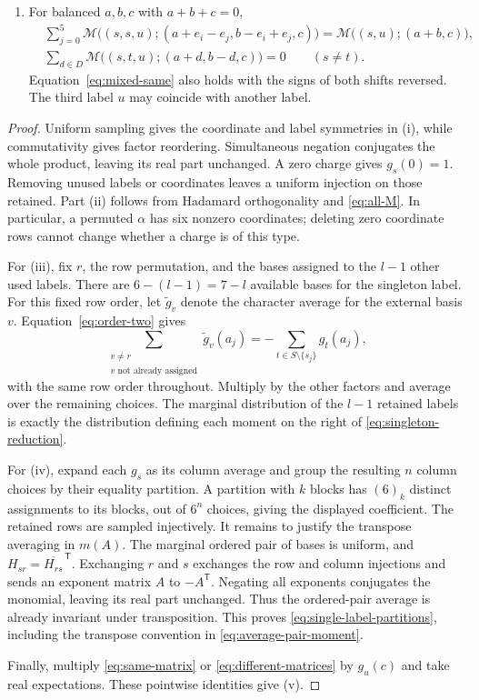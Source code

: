 \begin{lemma}
\begin{enumerate}[label=\textup{(\roman*)}]
 \item For balanced $a,b,c$ with $a+b+c=0$,
 \begin{align}
 &\sum_{j=0}^5
 \mathcal M\bigl((s,s,u);
       (a+e_i-e_j,b-e_i+e_j,c)\bigr)
   =\mathcal M\bigl((s,u);(a+b,c)\bigr),
       \label{eq:mixed-same}\\
 &\sum_{d\in D}
 \mathcal M\bigl((s,t,u);(a+d,b-d,c)\bigr)=0
       \qquad(s\ne t).
       \label{eq:mixed-different}
 \end{align}
 Equation~\eqref{eq:mixed-same} also holds with the signs of both shifts
 reversed. The third label $u$ may coincide with another label.
\end{enumerate}
\end{lemma}

\begin{proof}
Uniform sampling gives the coordinate and label symmetries in (i), while
commutativity gives factor reordering. Simultaneous negation conjugates
the whole product, leaving its real part unchanged. A zero charge gives
$g_s(0)=1$. Removing unused labels or coordinates leaves a uniform
injection on those retained. Part (ii) follows from Hadamard
orthogonality and \eqref{eq:all-M}. In particular, a permuted $\alpha$
has six nonzero coordinates; deleting zero coordinate rows cannot change
whether a charge is of this type.

For (iii), fix $r$, the row permutation, and the bases assigned to the
$l-1$ other used labels. There are $6-(l-1)=7-l$ available bases for the
singleton label. For this fixed row order, let $\widetilde g_v$ denote
the character average for the external basis $v$. Equation~\eqref{eq:order-two} gives
\[
 \sum_{\substack{v\ne r\\v\text{ not already assigned}}}
       \widetilde g_v(a_j)
 =-\sum_{t\in S\setminus\{s_j\}}g_t(a_j),
\]
with the same row order throughout. Multiply by the other factors and
average over the remaining choices. The marginal distribution of the
$l-1$ retained labels is exactly the distribution defining each moment
on the right of \eqref{eq:singleton-reduction}.

For (iv), expand each $g_s$ as its column average and group the resulting
$n$ column choices by their equality partition. A partition with $k$
blocks has $(6)_k$ distinct assignments to its blocks, out of $6^n$
choices, giving the displayed coefficient. The retained rows are sampled
injectively. It remains to justify the transpose averaging in $m(A)$.
The marginal ordered pair of bases is uniform, and
$H_{sr}=\overline{H_{rs}}^{\,\mathsf T}$. Exchanging $r$ and $s$
exchanges the row and column injections and sends an exponent matrix
$A$ to $-A^{\mathsf T}$. Negating all exponents conjugates the monomial,
leaving its real part unchanged. Thus the ordered-pair average is already
invariant under transposition. This proves \eqref{eq:single-label-partitions}, including
the transpose convention in \eqref{eq:average-pair-moment}.

Finally, multiply \eqref{eq:same-matrix} or
\eqref{eq:different-matrices} by $g_u(c)$ and take real expectations.
These pointwise identities give (v).
\end{proof}

